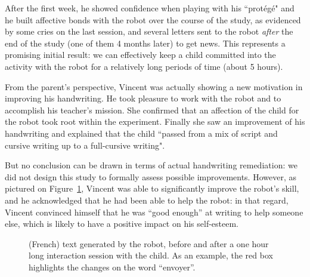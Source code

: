 \documentclass[conference]{IEEEtran}
\begin{document}
After the first week, he showed
confidence when playing with his ``prot\'eg\'e" and he built affective bonds with the robot
over the course of the study, as evidenced by some cries on the last session,
and several letters sent to the robot \emph{after} the end of the study
(one of them 4 months later) to get news. This represents a promising initial
result: we can effectively keep a child committed into the activity with the robot for a relatively
long periods of time (about 5 hours).

From the parent's perspective, Vincent was actually showing a new motivation in improving his handwriting. He took pleasure to work with the robot and to accomplish his teacher's mission. She confirmed that an affection of the child for the robot took root within the experiment. Finally she saw an improvement of his handwriting and explained that the child ``passed from a mix of script and cursive writing up to a full-cursive writing".

But no conclusion can be drawn in terms of actual handwriting remediation: we did
not design this study to formally assess possible improvements. However, as pictured on Figure~\ref{fig:stimuli}, Vincent was able to
significantly improve the robot's skill, and he acknowledged that he had been
able to help the robot: in that regard, Vincent convinced himself that he was
``good enough'' at writing to help someone else, which is likely to have
a positive impact on his self-esteem.

\begin{figure}
    \centering

    \caption{\small (French) text generated by the robot, before and after a one
        hour long interaction session with the child. As an example, the red box
        highlights the changes on the word ``envoyer''.}

    \label{fig:stimuli}
\end{figure}
\end{document}
